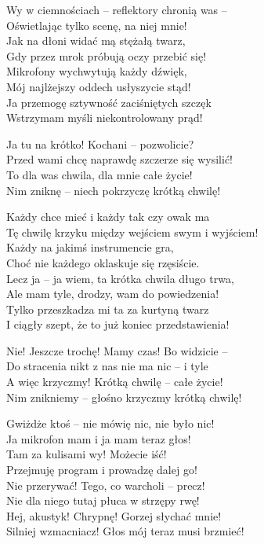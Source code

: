 \begin{text}
    Wy w ciemnościach –  reflektory chronią was –\\
    Oświetlając tylko scenę, na niej mnie!\\
    Jak na dłoni widać mą stężałą twarz,\\
    Gdy przez mrok próbują oczy przebić się!\\
    Mikrofony wychwytują każdy dźwięk,\\
    Mój najlżejszy oddech usłyszycie stąd!\\
    Ja przemogę sztywność zaciśniętych szczęk\\
    Wstrzymam myśli niekontrolowany prąd!

    Ja tu na krótko! Kochani – pozwolicie?\\
    Przed wami chcę naprawdę szczerze się wysilić!\\
    To dla was chwila, dla mnie całe życie!\\
    Nim zniknę – niech pokrzyczę krótką chwilę!

    Każdy chce mieć i każdy tak czy owak ma\\
    Tę chwilę krzyku między wejściem swym i wyjściem!\\
    Każdy na jakimś instrumencie gra,\\
    Choć nie każdego oklaskuje się rzęsiście.\\
    Lecz ja – ja wiem, ta krótka chwila długo trwa,\\
    Ale mam tyle, drodzy, wam do powiedzenia!\\
    Tylko przeszkadza mi ta za kurtyną twarz\\
    I ciągły szept, że to już koniec przedstawienia!

    Nie! Jeszcze trochę! Mamy czas! Bo widzicie –\\
    Do stracenia nikt z nas nie ma nic – i tyle\\
    A więc krzyczmy! Krótką chwilę – całe życie!\\
    Nim znikniemy – głośno krzyczmy krótką chwilę!

    Gwiżdże ktoś – nie mówię nic, nie było nic!\\
    Ja mikrofon mam i ja mam teraz głos!\\
    Tam za kulisami wy! Możecie iść!\\
    Przejmuję program i prowadzę dalej go!\\
    Nie przerywać! Tego, co warcholi – precz!\\
    Nie dla niego tutaj płuca w strzępy rwę!\\
    Hej, akustyk! Chrypnę! Gorzej słychać mnie!\\
    Silniej wzmacniacz! Głos mój teraz musi brzmieć!


\end{text}
